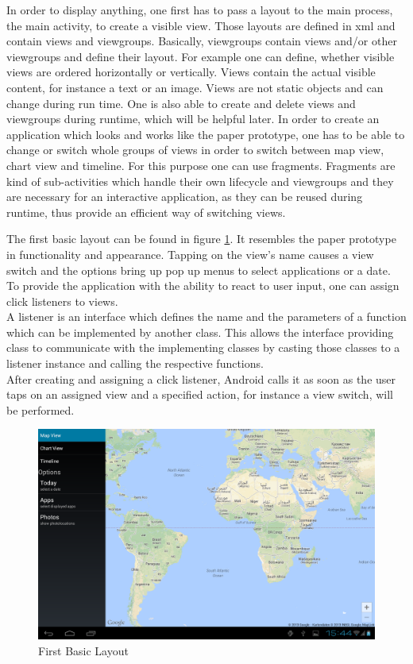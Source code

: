 In  order to display anything, one first has to pass a layout to the main process, the main activity, to create a visible view. Those layouts are defined in xml and contain views and viewgroups. Basically, viewgroups contain views and/or other viewgroups and define their layout. For example one can define, whether visible views are ordered horizontally or vertically. Views contain the actual visible content, for instance a text or an image. Views are not static objects and can change during run time. One is also able to create and delete views and viewgroups during runtime, which will be helpful later. In order to create an application which looks and works like the paper prototype, one has to be able to change or switch whole groups of views in order to switch between map view, chart view and timeline. For this purpose one can use fragments. Fragments are kind of sub-activities which handle their own lifecycle and viewgroups and they are necessary for an interactive application, as they can be reused during runtime, thus provide an efficient way of switching views.

The first basic layout can be found in figure \ref{img:firstbasiclayout}. It resembles the paper prototype in functionality and appearance. Tapping on the view's name causes a view switch and the options bring up pop up menus to select applications or a date.
To provide the application with the ability to react to user input, one can assign click listeners to views.\\
A listener is an interface which defines the name and the parameters of a function which can be implemented by another class. This allows the interface providing class to communicate with the implementing classes by casting those classes to a listener instance and calling the respective functions.\\
After creating and assigning a click listener, Android calls it as soon as the user taps on an assigned view and a specified action, for instance a view switch, will be performed.
\begin{figure}[h]
	\caption{First Basic Layout}
	\label{img:firstbasiclayout}
	\includegraphics[width=\textwidth]{images/Screenshots/v3/Screenshot_2013-08-19-15-44-21.png}
\end{figure}

